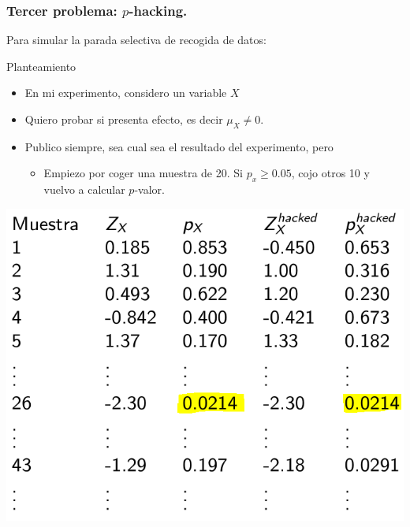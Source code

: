 \documentclass[9pt]{beamer}
\begin{document}
\begin{frame}
  \frametitle{Tercer problema: $p$-hacking.}
  Para simular la parada selectiva de recogida de datos:\\ 
  \begin{block}{Planteamiento}
    \begin{itemize}
    \item     En mi experimento, considero un variable $X$ 
    \item Quiero probar si presenta efecto, es decir $\mu_X \neq 0$.
    \item   Publico siempre, sea cual sea el resultado del
      experimento, pero
      \begin{itemize}
      \item Empiezo por coger una muestra de 20. Si  $p_x \geq 0.05$,
        cojo otros 10 y vuelvo a calcular $p$-valor.
      \end{itemize}
    \end{itemize}

  \end{block}
  \begin{center}
    \includegraphics[width=0.5\linewidth]{images/select_size-2} 
  \end{center}
\end{frame}
\end{document}
